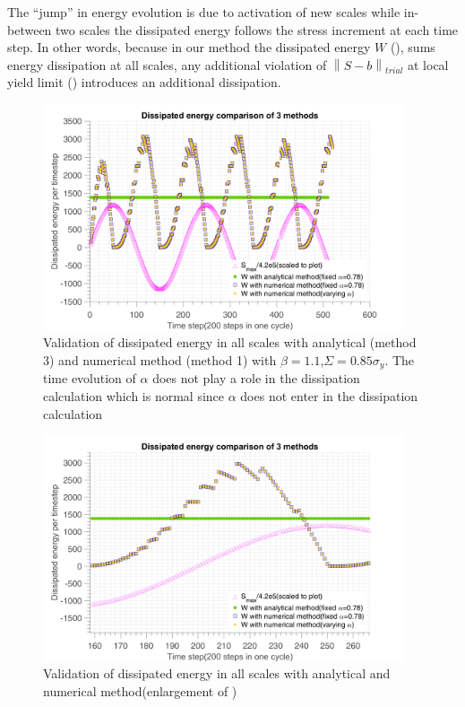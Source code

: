 The ``jump'' in energy evolution is due to activation of new scales while in-between two scales the dissipated energy follows the stress increment at each time step. In other words, because in our method the dissipated energy $W$ (), sums energy dissipation at all scales, any additional violation of $\left\|S-b \right\|_{trial}$ at local yield limit () introduces an additional dissipation. 

\begin{figure}[!h]
\centering
\includegraphics[width=0.95\textwidth]{figures//W_3methods.png} 
\caption{Validation of dissipated energy in all scales with analytical (method 3) and numerical method (method 1) with $\beta=1.1$,$\Sigma=0.85\sigma_y$. The time evolution of $\alpha$ does not play a role in the dissipation calculation which is normal since $\alpha$ does not enter in the dissipation calculation }
\label{fig.W3methods}
\end{figure}
\begin{figure}[!h]
	\centering
	\includegraphics[width=0.95\textwidth]{figures//W_3methods_enlarge.png} 
	\caption{Validation of dissipated energy in all scales with analytical and numerical method(enlargement of )}
	\label{fig.W3methodsenlarge}
\end{figure}
